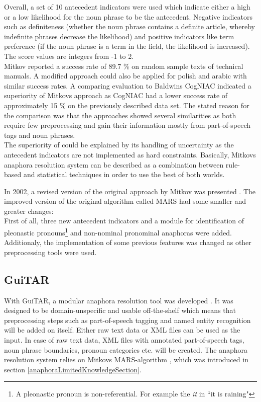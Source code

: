 Overall, a set of 10 antecedent indicators were used which indicate either a high or a low likelihood for the noun phrase to be the antecedent. Negative indicators such as definiteness (whether the noun phrase contains a definite article, whereby indefinite phrases decrease the likelihood) and positive indicators like term preference (if the noun phrase is a term in the field, the likelihood is increased). The score values are integers from -1 to 2. \\
Mitkov reported a success rate of 89.7 \% on random sample texts of technical manuals. A modified approach could also be applied for polish \citep{mitkov2000robust} and arabic \citep{mitkov1998multilingual} with similar success rates.
A comparing evaluation to Baldwins CogNIAC \citep{baldwin1997cogniac} indicated a superiority of Mitkovs approach \citep{mitkov1998robust} as CogNIAC had a lower success rate of approximately 15 \% on the previously described data set. The stated reason for the comparison was that the approaches showed several similarities as both require few preprocessing and gain their information mostly from part-of-speech tags and noun phrases.\\
The superiority of \citep{mitkov1998robust} could be explained by its handling of uncertainty as the antecedent indicators are not implemented as hard constraints. Basically, Mitkovs anaphora resolution system can be described as a combination between rule-based and statistical techniques in order to use the best of both worlds.

In 2002, a revised version of the original approach by Mitkov was presented \citep{mitkov2002new}. The improved version of the original algorithm called MARS had some smaller and greater changes:\\
First of all, three new antecedent indicators and a module for identification of pleonastic pronouns\footnote{A pleonastic pronoun is non-referential. For example the \textit{it} in “it is raining" } and non-nominal pronominal anaphoras were added. Additionaly, the implementation of some previous features was changed as other preprocessing tools were used.

\subsection{GuiTAR}
With GuiTAR, a modular anaphora resolution tool was developed \citep{poesio2004general}. It was designed to be domain-unspecific and usable off-the-shelf which means that preprocessing steps such as part-of-speech tagging and named entity recognition will be added on itself. Either raw text data or XML files can be used as the input. In case of raw text data, XML files with annotated part-of-speech tags, noun phrase boundaries, pronoun categories etc. will be created. The anaphora resolution system relies on Mitkovs MARS-algorithm \citep{mitkov2002new}, which was introduced in section \ref{anaphoraLimitedKnowledgeSection}. 

